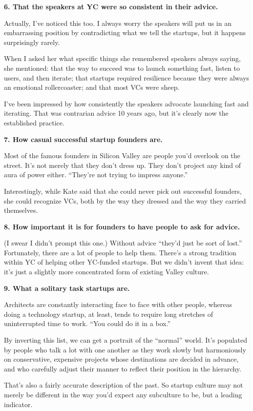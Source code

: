 \textbf{6. That the speakers at YC were so consistent in their advice.}

Actually, I've noticed this too. I always worry the speakers will put us
in an embarrassing position by contradicting what we tell the startups,
but it happens surprisingly rarely.

When I asked her what specific things she remembered speakers always
saying, she mentioned: that the way to succeed was to launch something
fast, listen to users, and then iterate; that startups required
resilience because they were always an emotional rollercoaster; and that
most VCs were sheep.

I've been impressed by how consistently the speakers advocate launching
fast and iterating. That was contrarian advice 10 years ago, but it's
clearly now the established practice.

\textbf{7. How casual successful startup founders are.}

Most of the famous founders in Silicon Valley are people you'd overlook
on the street. It's not merely that they don't dress up. They don't
project any kind of aura of power either. ``They're not trying to
impress anyone.''

Interestingly, while Kate said that she could never pick out successful
founders, she could recognize VCs, both by the way they dressed and the
way they carried themselves.

\textbf{8. How important it is for founders to have people to ask for
advice.}

(I swear I didn't prompt this one.) Without advice ``they'd just be sort
of lost.'' Fortunately, there are a lot of people to help them. There's
a strong tradition within YC of helping other YC-funded startups. But we
didn't invent that idea: it's just a slightly more concentrated form of
existing Valley culture.

\textbf{9. What a solitary task startups are.}

Architects are constantly interacting face to face with other people,
whereas doing a technology startup, at least, tends to require long
stretches of uninterrupted time to work. ``You could do it in a box.''

By inverting this list, we can get a portrait of the ``normal'' world.
It's populated by people who talk a lot with one another as they work
slowly but harmoniously on conservative, expensive projects whose
destinations are decided in advance, and who carefully adjust their
manner to reflect their position in the hierarchy.

That's also a fairly accurate description of the past. So startup
culture may not merely be different in the way you'd expect any
subculture to be, but a leading indicator.
